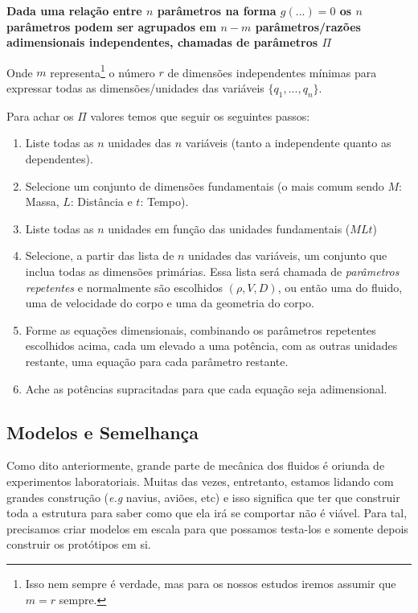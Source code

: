 \documentclass{article}
\begin{document}
\begin{center}
    \textbf{Dada uma relação entre $n$ parâmetros na forma $g(...)=0$ os $n$ parâmetros podem ser agrupados em $n-m$ parâmetros/razões adimensionais independentes, chamadas de parâmetros $\Pi$}
\end{center}

Onde $m$ representa\footnote{Isso nem sempre é verdade, mas para os nossos estudos iremos assumir que $m=r$ sempre.} o número $r$ de dimensões independentes mínimas para expressar todas as dimensões/unidades das variáveis $\{q_1, ..., q_n\}$.

Para achar os $\Pi$ valores temos que seguir os seguintes passos:
\begin{enumerate}
    \item Liste todas as $n$ unidades das $n$ variáveis (tanto a independente quanto as dependentes).
    \item Selecione um conjunto de dimensões fundamentais (o mais comum sendo $M$: Massa, $L$: Distância e $t$: Tempo).
    \item Liste todas as $n$ unidades em função das unidades fundamentais ($MLt$)
    \item Selecione, a partir das lista de $n$ unidades das variáveis, um conjunto que inclua todas as dimensões primárias. Essa lista será chamada de \emph{parâmetros repetentes} e normalmente são escolhidos $(\rho, V, D)$, ou então uma do fluido, uma de velocidade do corpo e uma da geometria do corpo.
    \item Forme as equações dimensionais, combinando os parâmetros repetentes escolhidos acima, cada um elevado a uma potência, com as outras unidades restante, uma equação para cada parâmetro restante.
    \item Ache as potências supracitadas para que cada equação seja adimensional.
\end{enumerate}

\subsection{Modelos e Semelhança}
Como dito anteriormente, grande parte de mecânica dos fluidos é oriunda de experimentos laboratoriais. Muitas das vezes, entretanto, estamos lidando com grandes construção (\emph{e.g} navius, aviões, etc) e isso significa que ter que construir toda a estrutura para saber como que ela irá se comportar
não é viável. Para tal, precisamos criar modelos em escala para que possamos testa-los e somente depois construir os protótipos em si.
\end{document}
